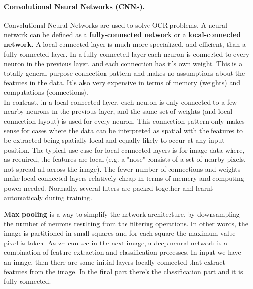 \paragraph*{Convolutional Neural Networks (CNNs).} Convolutional Neural Networks are used to solve OCR problems. A neural network can be defined as a \textbf{fully-connected network} or a \textbf{local-connected network}. A local-connected layer is much more specialized, and efficient, than a fully-connected layer. In a fully-connected layer each neuron is connected to every neuron in the previous layer, and each connection has it's own weight. This is a totally general purpose connection pattern and makes no assumptions about the features in the data. It's also very expensive in terms of memory (weights) and computations (connections).\\
In contrast, in a local-connected layer, each neuron is only connected to a few nearby neurons in the previous layer, and the same set of weights (and local connection layout) is used for every neuron. This connection pattern only makes sense for cases where the data can be interpreted as spatial with the features to be extracted being spatially local and equally likely to occur at any input position. The typical use case for local-connected layers is for image data where, as required, the features are local (e.g. a "nose" consists of a set of nearby pixels, not spread all across the image). The fewer number of connections and weights make local-connected layers relatively cheap in terms of memory and computing power needed.
Normally, several filters are packed together and learnt automaticaly during training.

\textbf{Max pooling} is a way to simplify the network architecture, by downsampling the number of neurons resulting from the filtering operations. In other words, the image is partitioned in small squares and for each square the maximum value pixel is taken.
As we can see in the next image, a deep neural network is a combination of feature extraction and classification processes. In input we have an image, then there are some initial layers locally-connected that extract features from the image. In the final part there's the classification part and it is fully-connected.

